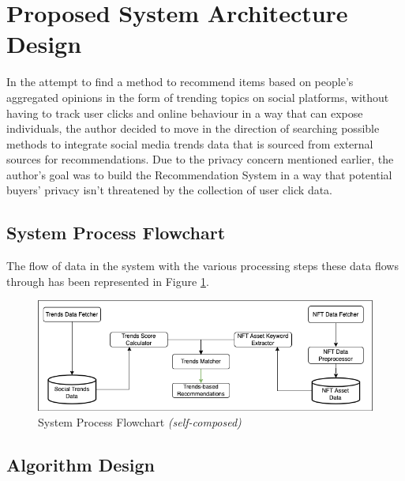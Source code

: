 \documentclass[manuscript,natbib=false]{acmart}
\begin{document}

\section{Proposed System Architecture Design}

In the attempt to find a method to recommend items based on people's aggregated opinions in the form of trending topics on social platforms, without having to track user clicks and online behaviour in a way that can expose individuals, the author decided to move in the direction of searching possible methods to integrate social media trends data that is sourced from external sources for recommendations.
Due to the privacy concern mentioned earlier, the author's goal was to build the Recommendation System in a way that potential buyers' privacy isn't threatened by the collection of user click data.

\subsection{System Process Flowchart}

The flow of data in the system with the various processing steps these data flows through has been represented in Figure \ref{fig:trends-recsys-system-process-flowchart}.

\begin{figure}[h]
\centering
\includegraphics[width=\linewidth]{images/system-process.png}
\caption{System Process Flowchart \textit{(self-composed)}}
\label{fig:trends-recsys-system-process-flowchart}
\end{figure}

\subsection{Algorithm Design}
\end{document}
